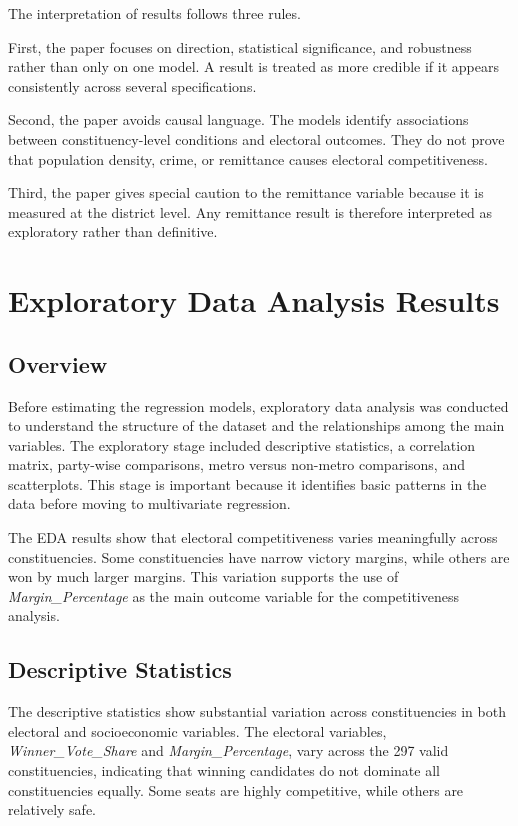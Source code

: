 \documentclass[12pt,a4paper]{article}
\begin{document}
The interpretation of results follows three rules.

First, the paper focuses on direction, statistical significance, and robustness rather than only on one model. A result is treated as more credible if it appears consistently across several specifications.

Second, the paper avoids causal language. The models identify associations between constituency-level conditions and electoral outcomes. They do not prove that population density, crime, or remittance causes electoral competitiveness.

Third, the paper gives special caution to the remittance variable because it is measured at the district level. Any remittance result is therefore interpreted as exploratory rather than definitive.

\section{Exploratory Data Analysis Results}

\subsection{Overview}

Before estimating the regression models, exploratory data analysis was conducted to understand the structure of the dataset and the relationships among the main variables. The exploratory stage included descriptive statistics, a correlation matrix, party-wise comparisons, metro versus non-metro comparisons, and scatterplots. This stage is important because it identifies basic patterns in the data before moving to multivariate regression.

The EDA results show that electoral competitiveness varies meaningfully across constituencies. Some constituencies have narrow victory margins, while others are won by much larger margins. This variation supports the use of \textit{Margin\_Percentage} as the main outcome variable for the competitiveness analysis.

\subsection{Descriptive Statistics}

The descriptive statistics show substantial variation across constituencies in both electoral and socioeconomic variables. The electoral variables, \textit{Winner\_Vote\_Share} and \textit{Margin\_Percentage}, vary across the 297 valid constituencies, indicating that winning candidates do not dominate all constituencies equally. Some seats are highly competitive, while others are relatively safe.
\end{document}
